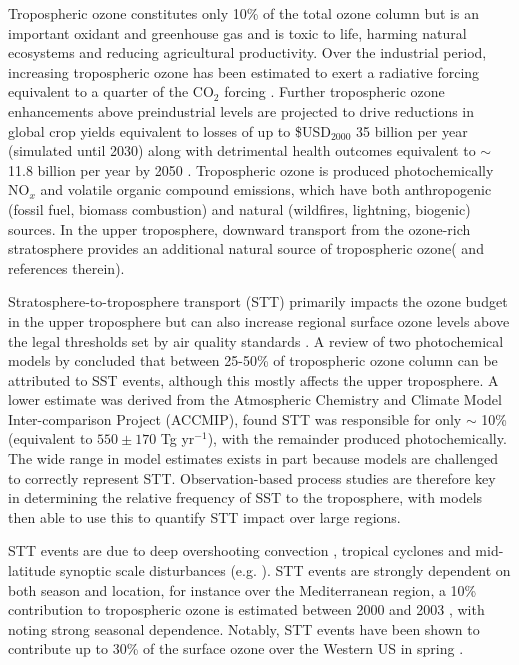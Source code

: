\documentclass{article}
\begin{document}
    Tropospheric ozone constitutes only 10\% of the total ozone column but is an important oxidant and greenhouse gas and is toxic to life, harming natural ecosystems and reducing agricultural productivity.
    Over the industrial period, increasing tropospheric ozone has been estimated to exert a radiative forcing equivalent to a quarter of the CO$_2$ forcing \citep{IPCC_Chapter2}. 
    Further tropospheric ozone enhancements above preindustrial levels are projected to drive reductions in global crop yields equivalent to losses of up to \$USD$_{2000}$ 35 billion per year (simulated until 2030) \citep{Avnery2011} along with detrimental health outcomes equivalent to $\sim$11.8 billion per year by 2050 \citep{Selin2009}.
    Tropospheric ozone is produced photochemically NO$_x$ and volatile organic compound emissions, which have both anthropogenic (fossil fuel, biomass combustion) and natural (wildfires, lightning, biogenic) sources.
    In the upper troposphere, downward transport from the ozone-rich stratosphere provides an additional natural source of tropospheric ozone(\citet{Jacobson2000} and references therein). 
 
    Stratosphere-to-troposphere transport (STT) primarily impacts the ozone budget in the upper troposphere but can also increase regional surface ozone levels above the legal thresholds set by air quality standards \citep{Danielson1968, Lefohn2011, Langford2012, Zhang2014}.
    A review of two photochemical models by \citet{Stohl2003} concluded that between 25-50\% of tropospheric ozone column can be attributed to SST events, although this mostly affects the upper troposphere.
    A lower estimate was derived from the Atmospheric Chemistry and Climate Model Inter-comparison Project (ACCMIP), \citet{Stevenson2006} found STT was responsible for only $\sim$ 10\% (equivalent to $550\pm170$ Tg yr$^{-1}$), with the remainder produced photochemically.
    The wide range in model estimates exists in part because models are challenged to correctly represent STT.
    Observation-based process studies are therefore key in determining the relative frequency of SST to the troposphere, with models then able to use this to quantify STT impact over large regions.
    
    STT events are due to deep overshooting convection \citep{Frey2015}, tropical cyclones \citep{Das2016} and mid-latitude synoptic scale disturbances (e.g. \citet{Stohl2003,Mihalikova2012}).
    STT events are strongly dependent on both season and location, for instance over the Mediterranean region, a 10\% contribution to tropospheric ozone is estimated between 2000 and 2003 \citep{Galani2003}, with \citet{Lefohn2011} noting strong seasonal dependence.
    Notably, STT events have been shown to contribute up to 30\% of the surface ozone over the Western US in spring \citep{Lin2012}.
    
\end{document}
